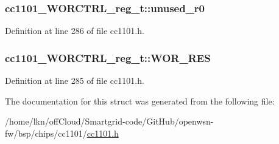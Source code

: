 \subsubsection[{\texorpdfstring{unused\+\_\+r0}{unused_r0}}]{ cc1101\+\_\+\+W\+O\+R\+C\+T\+R\+L\+\_\+reg\+\_\+t\+::unused\+\_\+r0}\hypertarget{structcc1101___w_o_r_c_t_r_l__reg__t_a88ce5e1df88de87cf36722325df4fa1f}{}\label{structcc1101___w_o_r_c_t_r_l__reg__t_a88ce5e1df88de87cf36722325df4fa1f}


Definition at line 286 of file cc1101.\+h.

\subsubsection[{\texorpdfstring{W\+O\+R\+\_\+\+R\+ES}{WOR_RES}}]{ cc1101\+\_\+\+W\+O\+R\+C\+T\+R\+L\+\_\+reg\+\_\+t\+::\+W\+O\+R\+\_\+\+R\+ES}\hypertarget{structcc1101___w_o_r_c_t_r_l__reg__t_ad398cc4e8223ed99e737a78b7420cdaa}{}\label{structcc1101___w_o_r_c_t_r_l__reg__t_ad398cc4e8223ed99e737a78b7420cdaa}


Definition at line 285 of file cc1101.\+h.



The documentation for this struct was generated from the following file\+:\begin{DoxyCompactItemize}
\item 
/home/lkn/off\+Cloud/\+Smartgrid-\/code/\+Git\+Hub/openwsn-\/fw/bsp/chips/cc1101/\hyperlink{cc1101_8h}{cc1101.\+h}\end{DoxyCompactItemize}
